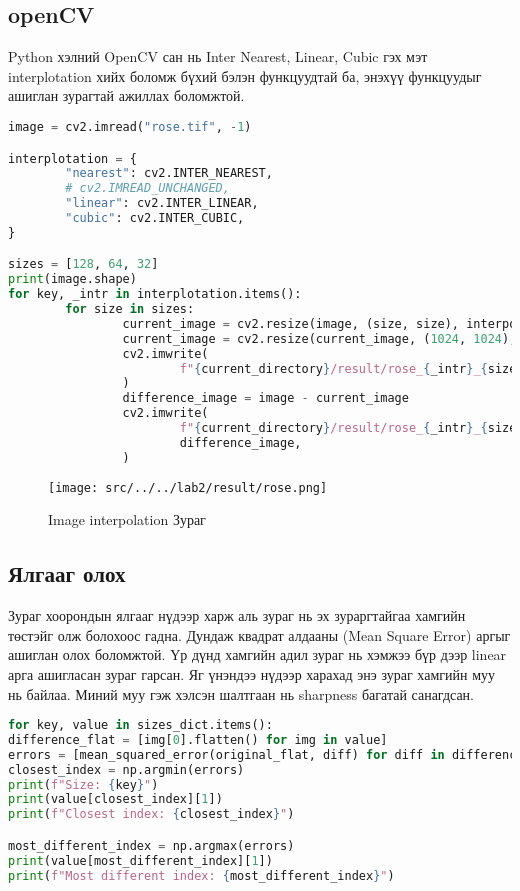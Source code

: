 \subsection{openCV}
Python хэлний OpenCV сан нь Inter Nearest, Linear, Cubic гэх мэт interplotation хийх боломж бүхий бэлэн функцуудтай ба, энэхүү функцуудыг ашиглан зурагтай ажиллах боломжтой. \cite{opencv}

\begin{lstlisting}[language=Python, caption=Image interpolation, frame=single]
image = cv2.imread("rose.tif", -1)

interplotation = {
		"nearest": cv2.INTER_NEAREST,
		# cv2.IMREAD_UNCHANGED,
		"linear": cv2.INTER_LINEAR,
		"cubic": cv2.INTER_CUBIC,
}

sizes = [128, 64, 32]
print(image.shape)
for key, _intr in interplotation.items():
		for size in sizes:
				current_image = cv2.resize(image, (size, size), interpolation=_intr)
				current_image = cv2.resize(current_image, (1024, 1024), interpolation=_intr)
				cv2.imwrite(
						f"{current_directory}/result/rose_{_intr}_{size}_{key}.tif", current_image
				)
				difference_image = image - current_image
				cv2.imwrite(
						f"{current_directory}/result/rose_{_intr}_{size}_{key}_difference.tif",
						difference_image,
				)
\end{lstlisting}

\begin{figure}
	\centering
	\texttt{[image: src/../../lab2/result/rose.png]}
	\caption{Image interpolation Зураг}
\end{figure}

\subsection{Ялгааг олох}

Зураг хоорондын ялгааг нүдээр харж аль зураг нь эх зураргтайгаа хамгийн төстэйг олж болохоос гадна. Дундаж квадрат алдааны (Mean Square Error) аргыг ашиглан олох боломжтой.\cite{scikit-learn} Үр дүнд хамгийн адил зураг нь хэмжээ бүр дээр linear арга ашигласан зураг гарсан. Яг үнэндээ нүдээр харахад энэ зураг хамгийн муу нь байлаа. Миний муу гэж хэлсэн шалтгаан нь sharpness багатай санагдсан.

\begin{lstlisting}[language=Python, caption=Mean squared error code, frame=single]
for key, value in sizes_dict.items():
difference_flat = [img[0].flatten() for img in value]
errors = [mean_squared_error(original_flat, diff) for diff in difference_flat]
closest_index = np.argmin(errors)
print(f"Size: {key}")
print(value[closest_index][1])
print(f"Closest index: {closest_index}")

most_different_index = np.argmax(errors)
print(value[most_different_index][1])
print(f"Most different index: {most_different_index}")
	\end{lstlisting}

